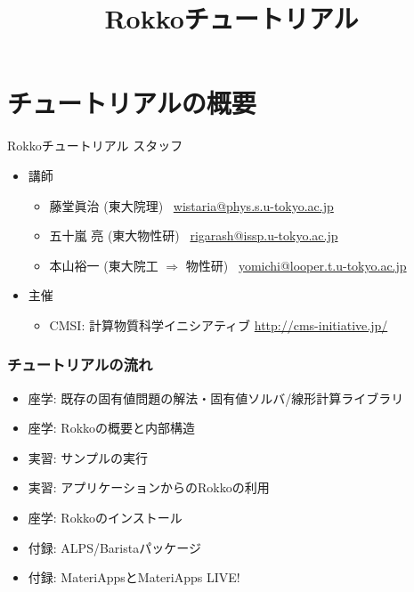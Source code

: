 \title{Rokkoチュートリアル}




\begin{frame}
  \titlepage
\end{frame}


\section{チュートリアルの概要}

\begin{frame}{Rokkoチュートリアル スタッフ}
  \begin{itemize}
  \item 講師
    \setlength{\itemsep}{1em}
    \begin{itemize}
    \item 藤堂眞治 (東大院理) \ \href{mailto:wistaria@phys.s.u-tokyo.ac.jp}{wistaria@phys.s.u-tokyo.ac.jp}
    \item 五十嵐 亮 (東大物性研) \ \href{mailto:rigarash@issp.u-tokyo.ac.jp}{rigarash@issp.u-tokyo.ac.jp}
    \item 本山裕一 (東大院工 $\Rightarrow $ 物性研) \ \href{mailto:yomichi@looper.u-tokyo.ac.jp}{yomichi@looper.t.u-tokyo.ac.jp}
    \end{itemize}
  \item 主催
    \begin{itemize}
    \item CMSI: 計算物質科学イニシアティブ \url{http://cms-initiative.jp/}
    \end{itemize}
  \end{itemize}
\end{frame}

\begin{frame}
  \frametitle{チュートリアルの流れ}
  \begin{itemize}
  \item 座学: 既存の固有値問題の解法・固有値ソルバ/線形計算ライブラリ
  \item 座学: Rokkoの概要と内部構造
  \item 実習: サンプルの実行
  \item 実習: アプリケーションからのRokkoの利用
  \item 座学: Rokkoのインストール
  \item 付録: ALPS/Baristaパッケージ
  \item 付録: MateriAppsとMateriApps LIVE!
  \end{itemize}
\end{frame}

